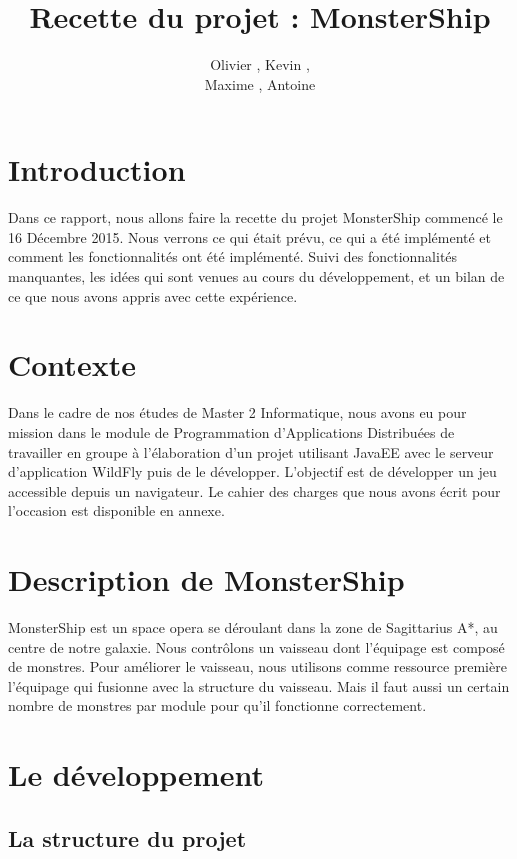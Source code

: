 \documentclass[a4paper,11pt]{report}
\title{Recette du projet : MonsterShip}
\author{Olivier \bsc{Boissard}, Kevin \bsc{Boulala},\\Maxime \bsc{Dubois}, Antoine \bsc{Lavier}}
\begin{document}
\maketitle
\setcounter{tocdepth}{1}
\tableofcontents

\chapter{Introduction}
  Dans ce rapport, nous allons faire la recette du projet MonsterShip commencé le 16 Décembre 2015. Nous verrons ce qui était prévu, ce qui a été implémenté et comment les fonctionnalités ont été implémenté. Suivi des fonctionnalités manquantes, les idées qui sont venues au cours du développement, et un bilan de ce que nous avons appris avec cette expérience.
  
\chapter{Contexte}
  Dans le cadre de nos études de Master 2 Informatique, nous avons eu pour mission dans le module de Programmation d'Applications Distribuées de travailler en groupe à l'élaboration d'un projet utilisant JavaEE avec le serveur d'application WildFly puis de le développer. L'objectif est de développer un jeu accessible depuis un navigateur. Le cahier des charges que nous avons écrit pour l'occasion est disponible en annexe.

\chapter{Description de MonsterShip}
  MonsterShip est un space opera se déroulant dans la zone de Sagittarius A*, au centre de notre galaxie. Nous contrôlons un vaisseau dont l'équipage est composé de monstres. Pour améliorer le vaisseau, nous utilisons comme ressource première l'équipage qui fusionne avec la structure du vaisseau. Mais il faut aussi un certain nombre de monstres par module pour qu'il fonctionne correctement.

\chapter{Le développement}
  \section{La structure du projet}
\end{document}
